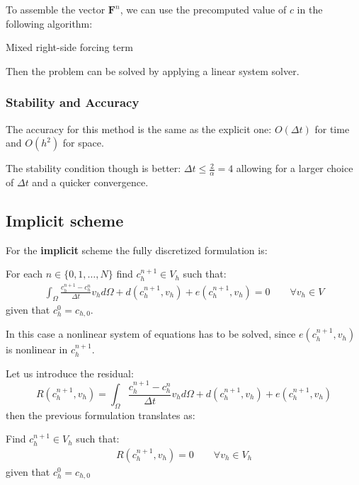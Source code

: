 \documentclass[12pt, letterpaper]{article}
\begin{document}
\noindent To assemble the vector $\mathbf{F}^n$, we can use the precomputed value of $c$ in the following algorithm:


\begin{algorithm}[H]
    \caption{Mixed right-side forcing term}

\end{algorithm}

\noindent Then the problem can be solved by applying a linear system solver.

\subsubsection{Stability and Accuracy}
The accuracy for this method is the same as the explicit one: $O(\Delta t)$ for time and $O(h^2)$ for space.

\noindent The stability condition though is better: $\Delta t\leq\frac2\alpha=4$ allowing for a larger choice of $\Delta t$ and a quicker convergence.
\pagebreak
\subsection{Implicit scheme}
For the \textbf{implicit} scheme the fully discretized formulation is:

\vspace{1em}
\noindent
For each $n \in \{0,1,\dots,N\}$ find $c_h^{n+1}\in V_h$ such that:
\begin{gather}
\int_\Omega\frac{c_h^{n+1}-c_h^n}{\Delta t}v_hd\Omega+d(c_h^{n+1},v_h)+e(c_h^{n+1},v_h)=0
\qquad \forall v_h\in V
\end{gather}
given that $c_h^0=c_{h,0}$.

\noindent In this case a nonlinear system of equations has to be solved, since $e(c_h^{n+1},v_h)$ is nonlinear in $c_h^{n+1}$. 

\noindent Let us introduce the residual:
$$
R(c_h^{n+1},v_h)=\int_\Omega\frac{c_h^{n+1}-c_h^n}{\Delta t}v_hd\Omega+d(c_h^{n+1},v_h)+e(c_h^{n+1},v_h)
$$
then the previous formulation translates as:

\noindent Find $c_h^{n+1}\in V_h$ such that:
\begin{gather}
R(c_h^{n+1},v_h)=0 
\qquad \forall v_h \in V_h
\end{gather}
given that $c_h^0=c_{h,0}$
\end{document}
